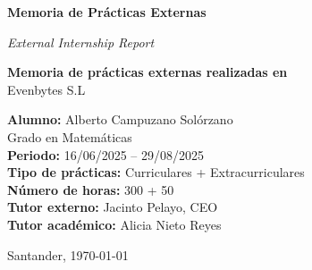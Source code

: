 \begin{titlepage}
\begin{center}
{\Huge \textbf{Memoria de Prácticas Externas}}

\vspace{0.5cm}

{\large \textit{External Internship Report}}

\vspace{1cm}

\textbf{Memoria de prácticas externas realizadas en}\\[0.5cm]
{\large Evenbytes S.L}

\vfill

\textbf{Alumno:} Alberto Campuzano Solórzano \\
Grado en Matemáticas \\[0.3cm]
\textbf{Periodo:} 16/06/2025 – 29/08/2025 \\
\textbf{Tipo de prácticas:} Curriculares + Extracurriculares \\
\textbf{Número de horas:} 300 + 50 \\[0.5cm]
\textbf{Tutor externo:} Jacinto Pelayo, CEO \\
\textbf{Tutor académico:} Alicia Nieto Reyes

\vspace{1cm}

Santander, \today

\end{center}
\end{titlepage}